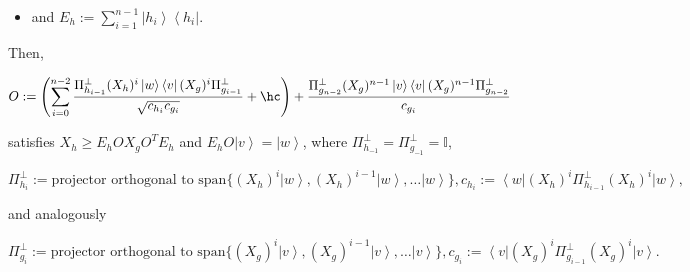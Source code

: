 \documentclass{theoretics}
\begin{document}
\begin{proposition}
\begin{itemize}
    \item and $E_{h}:=\sum_{i=1}^{n-1}\left|h_{i}\right\rangle \left\langle h_{i}\right|$.
  \end{itemize}
  Then,
  \begin{small}
    \begin{displaymath}
      O:=\left(\sum_{i=0}^{n-2}\frac{\Pi_{h_{i-1}}^{\perp}(X_{h})^{i}\left|w\right\rangle \left\langle v\right|(X_{g})^{i}\Pi_{g_{i-1}}^{\perp}}{\sqrt{c_{h_{i}}c_{g_{i}}}}+\hc\right)+\frac{\Pi_{g_{n-2}}^{\perp}(X_{g})^{n-1}\left|v\right\rangle \left\langle v\right|(X_{g})^{n-1}\Pi_{g_{n-2}}^{\perp}}{c_{g_{i}}}
    \end{displaymath}
  \end{small}	satisfies $X_{h}\ge E_{h}OX_{g}O^{T}E_{h}$ and $E_{h}O\left|v\right\rangle =\left|w\right\rangle$,
  where $\Pi_{h_{-1}}^{\perp}=\Pi_{g_{-1}}^{\perp}=\mathbb{I}$,
  \begin{small}
    \begin{displaymath}
      \Pi_{h_{i}}^{\perp}:=\text{projector orthogonal to }\text{span}\{(X_{h})^{i}\left|w\right\rangle ,(X_{h})^{i-1}\left|w\right\rangle ,\dots\left|w\right\rangle \},
      c_{h_{i}}:=\left\langle w\right|(X_{h})^{i}\Pi_{h_{i-1}}^{\perp}(X_{h})^{i}\left|w\right\rangle,\end{displaymath}
  \end{small} and analogously
  \begin{small}
    \begin{displaymath}
      \Pi_{g_{i}}^{\perp}:=\text{projector orthogonal to }\text{span}\{(X_{g})^{i}\left|v\right\rangle ,(X_{g})^{i-1}\left|v\right\rangle ,\dots\left|v\right\rangle \},
      c_{g_{i}}:=\left\langle v\right|(X_{g})^{i}\Pi_{g_{i-1}}^{\perp}(X_{g})^{i}\left|v\right\rangle .\end{displaymath}
  \end{small}

\end{proposition}
\end{document}
